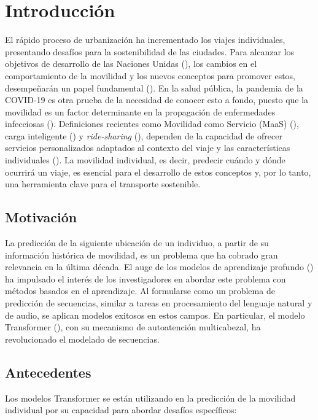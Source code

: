 \chapter*{Introducción}\label{chapter:introduction}

El rápido proceso de urbanización ha incrementado los viajes 
individuales, presentando desafíos para la sostenibilidad de las 
ciudades. Para alcanzar los objetivos de desarrollo de las 
Naciones Unidas (\cite{Griggs2013}), los cambios en el comportamiento de 
la movilidad y los nuevos conceptos para promover estos, 
desempeñarán un papel fundamental
 (\cite{Martin2021}). En la salud p\'ublica, la pandemia de la COVID-19 es otra prueba
de la necesidad de conocer esto a fondo, puesto
que la movilidad es un factor determinante en la propagación
de enfermedades infecciosas  (\cite{Kraemer2020}). Definiciones recientes como
Movilidad como
Servicio (MaaS) (\cite{Reck2022}), carga inteligente (\cite{Xu2018}) y 
\textit{ride-sharing} (\cite{Huang2019}), dependen de la capacidad de ofrecer 
servicios personalizados adaptados al contexto del viaje y las 
características individuales (\cite{Ma2022}).
La movilidad individual, es decir, predecir cuándo y dónde ocurrirá 
un viaje, es esencial para el desarrollo de estos conceptos y, 
por lo tanto, una herramienta clave para el transporte sostenible.

\section{Motivación}
La predicción de la siguiente ubicación de un individuo, a partir 
de su información histórica de movilidad, es un problema que ha cobrado 
gran relevancia en la última década. El auge de los modelos de 
aprendizaje profundo (\cite{luca2021survey}) ha impulsado el interés de 
los investigadores en abordar este problema con métodos basados 
en el aprendizaje.  Al formularse como un problema de predicción 
de secuencias, similar a tareas en procesamiento del lenguaje 
natural y de audio, se aplican modelos exitosos en estos campos.  
En particular, el modelo Transformer (\cite{vaswani2017attention}), con su mecanismo 
de autoatención multicabezal, ha revolucionado el modelado de 
secuencias.
\newpage
\section{Antecedentes}

Los modelos Transformer se están utilizando en la predicción de la 
movilidad individual por su capacidad para abordar desafíos 
específicos: 

